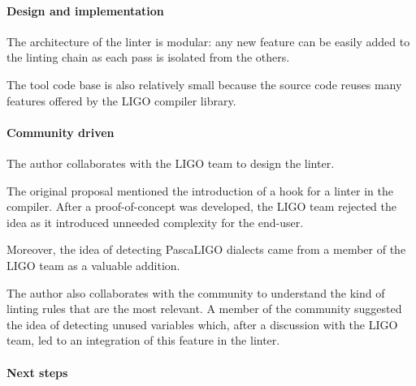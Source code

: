 \documentclass[10pt,a4paper]{article}
\begin{document}

\paragraph{Design and implementation}

The architecture of the linter is modular: any new feature can be
easily added to the linting chain as each pass is isolated from the
others.

The tool code base is also relatively small because the source code
reuses many features offered by the LIGO compiler library.


\paragraph{Community driven}

The author collaborates with the LIGO team to design the linter.

The original proposal mentioned the introduction of a hook for a
linter in the compiler. After a proof-of-concept was developed, the
LIGO team rejected the idea as it introduced unneeded complexity for
the end-user.

Moreover, the idea of detecting PascaLIGO dialects came from a member
of the LIGO team as a valuable addition.

The author also collaborates with the community to understand the kind
of linting rules that are the most relevant. A member of the community
suggested the idea of detecting unused variables which, after a
discussion with the LIGO team, led to an integration of this feature
in the linter.

\paragraph{Next steps}
\end{document}
